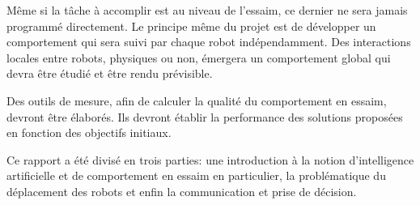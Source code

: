 Même si la tâche à accomplir est au niveau de l'essaim, ce dernier ne sera jamais programmé directement. Le principe même du projet est de développer un comportement qui sera suivi par chaque robot indépendamment. Des interactions locales entre robots, physiques ou non, émergera un comportement global qui devra être étudié et être rendu prévisible.

Des outils de mesure, afin de calculer la qualité du comportement en essaim, devront être élaborés. Ils devront établir la performance des solutions proposées en fonction des objectifs initiaux.~\cite{cahierCharges}

\vspace{2em}Ce rapport a été divisé en trois parties: une introduction à la notion d'intelligence artificielle et de comportement en essaim en particulier, la problématique du déplacement des robots et enfin la communication et prise de décision.